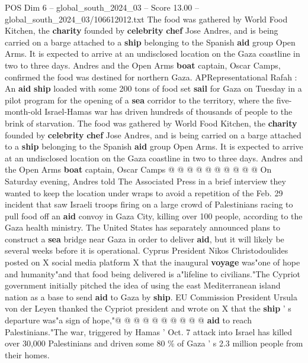 \begin{textsample}{POS Dim 6 – global\_south\_2024\_03 – Score 13.00 – global\_south\_2024\_03/106612012.txt}  \label{ex:f6_pos_033}
The food was gathered by World Food Kitchen, the \textbf{charity} founded by \textbf{celebrity} \textbf{chef} Jose Andres, and is being carried on a barge attached to a \textbf{ship} belonging to the Spanish \textbf{aid} group Open Arms.
It is expected to arrive at an undisclosed location on the Gaza coastline in two to three days.
Andres and the Open Arms \textbf{boat} captain, Oscar Camps, confirmed the food was destined for northern Gaza.
APRepresentational Rafah : An \textbf{aid} \textbf{ship} loaded with some 200 tons of food set \textbf{sail} for Gaza on Tuesday in a pilot program for the opening of a \textbf{sea} corridor to the territory, where the five-month-old Israel-Hamas war has driven hundreds of thousands of people to the brink of starvation.
The food was gathered by World Food Kitchen, the \textbf{charity} founded by \textbf{celebrity} \textbf{chef} Jose Andres, and is being carried on a barge attached to a \textbf{ship} belonging to the Spanish \textbf{aid} group Open Arms.
It is expected to arrive at an undisclosed location on the Gaza coastline in two to three days.
Andres and the Open Arms \textbf{boat} captain, Oscar Camps @ @ @ @ @ @ @ @ @ @ On Saturday evening, Andres told The Associated Press in a brief interview they wanted to keep the location under wraps to avoid a repetition of the Feb. 29 incident that saw Israeli troops firing on a large crowd of Palestinians racing to pull food off an \textbf{aid} convoy in Gaza City, killing over 100 people, according to the Gaza health ministry.
The United States has separately announced plans to construct a \textbf{sea} bridge near Gaza in order to deliver \textbf{aid}, but it will likely be several weeks before it is operational.
Cyprus President Nikos Christodoulides posted on X social media platform X that the inaugural \textbf{voyage} was"one of hope and humanity"and that food being delivered is a"lifeline to civilians."The Cypriot government initially pitched the idea of using the east Mediterranean island nation as a base to send \textbf{aid} to Gaza by \textbf{ship}.
EU Commission President Ursula von der Leyen thanked the Cypriot president and wrote on X that the \textbf{ship} ' s departure was"a sign of hope,"@ @ @ @ @ @ @ @ @ @ \textbf{aid} to reach Palestinians."The war, triggered by Hamas ' Oct. 7 attack into Israel has killed over 30,000 Palestinians and driven some 80 \% of Gaza ' s 2.3 million people from their homes.

\end{textsample}
